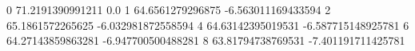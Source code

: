 0 71.2191390991211 0.0
1 64.6561279296875 -6.563011169433594
2 65.1861572265625 -6.032981872558594
4 64.63142395019531 -6.587715148925781
6 64.27143859863281 -6.947700500488281
8 63.81794738769531 -7.401191711425781

